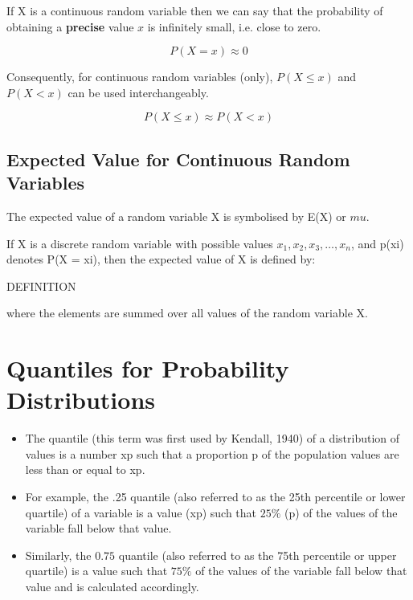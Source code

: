 If X is a continuous random variable then we can say that the probability of obtaining a \textbf{precise} value $x$ is infinitely small, i.e. close to zero.

\[P(X=x) \approx 0 \]

Consequently, for continuous random variables (only),  $P(X \leq x)$ and $P(X < x)$ can be used interchangeably.

\[P(X \leq x) \approx P(X < x) \]

\subsection{Expected Value for Continuous Random Variables}
The expected value of a random variable X is symbolised by E(X) or $mu$.


If X is a discrete random variable with possible values $x_1, x_2, x_3, \ldots, x_n$, and p(xi) denotes P(X = xi), then the expected value of X is defined by: 

DEFINITION

where the elements are summed over all values of the random variable X. 


\section{Quantiles for Probability Distributions}
\begin{itemize}
\item The quantile (this term was first used by Kendall, 1940) of a distribution of values is a number xp such that a proportion p of the population values are less than or equal to xp. 

\item For example, the .25 quantile (also referred to as the 25th percentile or lower quartile) of a variable is a value (xp) such that $25\%$ (p) of the values of the variable fall below that value.

\item Similarly, the $0.75$ quantile (also referred to as the 75th percentile or upper quartile) is a value such that $75\%$ of the values of the variable fall below that value and is calculated accordingly.
\end{itemize}

